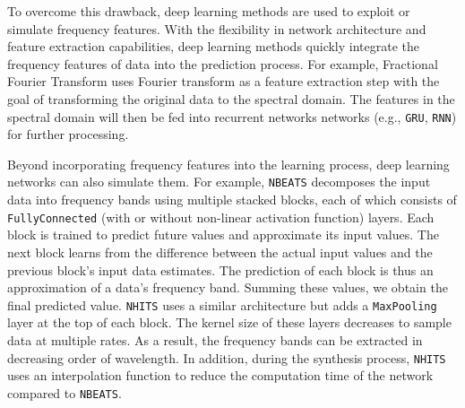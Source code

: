 \documentclass[a4paper,fleqn]{cas-sc}
\begin{document}
\vspace{1mm}

To overcome this drawback, deep learning methods are used to exploit or simulate frequency features. With the flexibility in network architecture and feature extraction capabilities, deep learning methods quickly integrate the frequency features of data into the prediction process. For example, Fractional Fourier Transform \cite{kocc2022fractional} uses Fourier transform as a feature extraction step with the goal of transforming the original data to the spectral domain. The features in the spectral domain will then be fed into recurrent networks networks (e.g., \verb|GRU|, \verb|RNN|) for further processing.

\vspace{1mm}

Beyond incorporating frequency features into the learning process, deep learning networks can also simulate them. For example, \verb|NBEATS| \cite{oreshkin2019n} decomposes the input data into frequency bands using multiple stacked blocks, each of which consists of \verb|FullyConnected| (with or without non-linear activation function) layers. Each block is trained to predict future values and approximate its input values. The next block learns from the difference between the actual input values and the previous block's input data estimates. The prediction of each block is thus an approximation of a data's frequency band. Summing these values, we obtain the final predicted value. \verb|NHITS| uses a similar architecture but adds a \verb|MaxPooling| layer at the top of each block. The kernel size of these layers decreases to sample data at multiple rates. As a result, the frequency bands can be extracted in decreasing order of wavelength. In addition, during the synthesis process, \verb|NHITS| uses an interpolation function to reduce the computation time of the network compared to \verb|NBEATS|.

\vspace{1mm}


\end{document}
